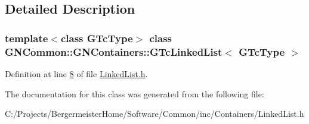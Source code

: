 \subsection{Detailed Description}
\subsubsection*{template$<$class G\+Tc\+Type$>$\newline
class G\+N\+Common\+::\+G\+N\+Containers\+::\+G\+Tc\+Linked\+List$<$ G\+Tc\+Type $>$}



Definition at line \mbox{\hyperlink{_linked_list_8h_source_l00008}{8}} of file \mbox{\hyperlink{_linked_list_8h_source}{Linked\+List.\+h}}.



The documentation for this class was generated from the following file\+:\begin{DoxyCompactItemize}
\item 
C\+:/\+Projects/\+Bergermeister\+Home/\+Software/\+Common/inc/\+Containers/Linked\+List.\+h\end{DoxyCompactItemize}
